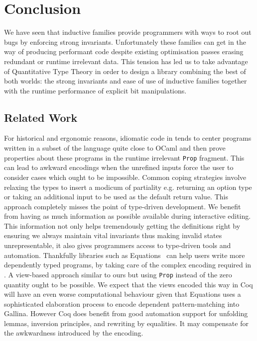 

\section{Conclusion}\label{sec:conclusion}

We have seen that inductive families provide programmers with ways to root out bugs
by enforcing strong invariants. Unfortunately these families can get in the way of
producing performant code despite existing optimisation passes erasing redundant
or runtime irrelevant data.
%
This tension has led us to take advantage of Quantitative Type Theory
in order to design a library
combining the best of both worlds: the strong invariants and ease of use of inductive
families together with the runtime performance of explicit bit manipulations.

\subsection{Related Work}

For historical and ergonomic reasons, idiomatic code in \coq{} tends to center programs
written in a subset of the language quite close to OCaml and then prove properties
about these programs in the runtime irrelevant \texttt{Prop} fragment.
%
This can lead to awkward encodings when the unrefined inputs force the user to consider
cases which ought to be impossible. Common coping strategies involve relaxing the types
to insert a modicum of partiality e.g. returning an option type or taking an additional
input to be used as the default return value.
%
This approach completely misses the point of type-driven development.
%
We benefit from having as much information as possible available during
interactive editing.
%
This information not only helps tremendously getting the definitions right by
ensuring we always maintain vital invariants thus making invalid states
unrepresentable, it also gives programmers access to type-driven tools and automation.
%
Thankfully libraries such as Equations~\cite{DBLP:conf/itp/Sozeau10,DBLP:journals/pacmpl/SozeauM19}
can help users write more dependently typed programs, by taking care of the complex
encoding required in \coq{}. A view-based approach similar to ours but using \texttt{Prop}
instead of the zero quantity ought to be possible.
%
We expect that the views encoded this way in Coq will have an even worse computational
behaviour given that Equations uses a sophisticated elaboration process to encode dependent
pattern-matching into Gallina.
%
However Coq does benefit from good automation support for unfolding lemmas, inversion
principles, and rewriting by equalities. It may compensate for the awkwardness introduced
by the encoding.

